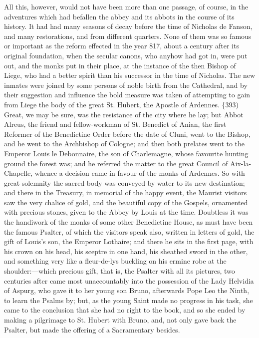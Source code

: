 All this, however, would not have been more than one passage, of
course, in the adventures which had befallen the abbey and its abbots
in the course of its history. It had had many seasons of decay before
the time of Nicholas de Fanson, and many restorations, and from
different quarters. None of them was so famous or important as the
reform effected in the year 817, about a century after its original
foundation, when the secular canons, who anyhow had got in, were put
out, and the monks put in their place, at the instance of the then
Bishop of Liege, who had a better spirit than his successor in the
time of Nicholas. The new inmates were joined by some persons of noble
birth from the Cathedral, and by their suggestion and influence the
bold measure was taken of attempting to gain from Liege the body of
the great St. Hubert, the Apostle of Ardennes. \{393) Great, we may be
sure, was the resistance of the city where he lay; but Abbot Alreus,
the friend and fellow-workman of St. Benedict of Anian, the first
Reformer of the Benedictine Order before the date of Cluni, went to
the Bishop, and he went to the Archbishop of Cologne; and then both
prelates went to the Emperor Louis le Debonnaire, the son of
Charlemagne, whose favourite hunting ground the forest was; and he
referred the matter to the great Council of Aix-la-Chapelle, whence a
decision came in favour of the monks of Ardennes. So with great
solemnity the sacred body was conveyed by water to its new
destination; and there in the Treasury, in memorial of the happy
event, the Maurist visitors saw the very chalice of gold, and the
beautiful copy of the Gospels, ornamented with precious stones, given
to the Abbey by Louis at the time. Doubtless it was the handiwork of
the monks of some other Benedictine House, as must have been the
famous Psalter, of which the visitors speak also, written in letters
of gold, the gift of Louis's son, the Emperor Lothaire; and there he
sits in the first page, with his crown on his head, his sceptre in one
hand, his sheathed sword in the other, and something very like a
fleur-de-lys buckling on his ermine robe at the shoulder:—which
precious gift, that is, the Psalter with all its pictures, two
centuries after came most unaccountably into the possession of the
Lady Helvidia of Aspurg, who gave it to her young son Bruno,
afterwards Pope Leo the Ninth, to learn the Psalms by; but, as the
young Saint made no progress in his task, she came to the conclusion
that she had no right to the book, and so she ended by making a
pilgrimage to St. Hubert with Bruno, and, not only gave back the
Psalter, but made the offering of a Sacramentary besides.

